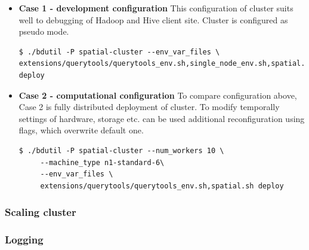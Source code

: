 \documentclass[a4paper,12pt,oneside]{report}
\begin{document}
 
\begin{itemize}
\item \textbf{Case 1 - development configuration}  This configuration of cluster suits well to debugging 
of Hadoop and Hive client site. Cluster is configured as pseudo mode.
\begin{footnotesize}\begin{lstlisting}[style=python]
$ ./bdutil -P spatial-cluster --env_var_files \
extensions/querytools/querytools_env.sh,single_node_env.sh,spatial.sh deploy
\end{lstlisting}\end{footnotesize}


\item \textbf{Case 2 - computational configuration}  To compare configuration above, Case 2 is fully 
distributed deployment of cluster. To modify temporally settings of hardware, storage etc. can be used 
additional reconfiguration using flags, which overwrite default one.
%
\begin{footnotesize}\begin{lstlisting}[style=python]
$ ./bdutil -P spatial-cluster --num_workers 10 \
     --machine_type n1-standard-6\
     --env_var_files \
     extensions/querytools/querytools_env.sh,spatial.sh deploy
\end{lstlisting}\end{footnotesize}

\end{itemize}




            \subsubsection{Scaling cluster}
            \subsubsection{Logging}
        
\end{document}
